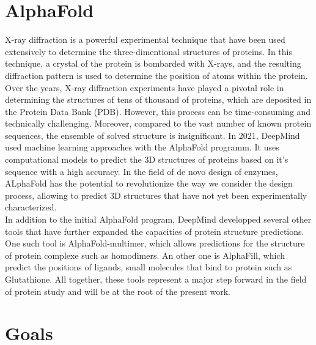 \section{AlphaFold}
X-ray diffraction is a powerful experimental technique that have been used extensively to determine the three-dimentional structures of proteins. 
In this technique, a crystal of the protein is bombarded with X-rays, and the resulting diffraction pattern is used to determine the position of atoms within the protein. Over the years, X-ray diffraction experiments have played a pivotal role in determining the structures of tens of thousand of proteins, which are deposited in the Protein Data Bank (PDB). 
However, this process can be time-consuming and technically challenging. Moreover, compared to the vast number of known protein sequences, the ensemble of solved structure is insignificant. In 2021, DeepMind used machine learning approaches with the AlphaFold\cite{AlphaFold} programm. It uses computational models to predict the 3D structures of proteins based on it's sequence with a high accuracy. In the field of de novo design of enzymes, ALphaFold has the potential to revolutionize the way we consider the design process, allowing to predict 3D structures that have not yet been experimentally characterized.\\
\noindent In addition to the initial AlphaFold program, DeepMind developped several other tools that have further expanded the capacities of protein structure predictions. One such tool is AlphaFold-multimer\cite{Multimer}, which allows predictions for the structure of protein complexe such as homodimers. An other one is AlphaFill\cite{AlphaFill}, which predict the positions of ligands, small molecules that bind to protein such as Glutathione. All together, these tools represent a major step forward in the field of protein study and will be at the root of the present work.
\section{Goals}

